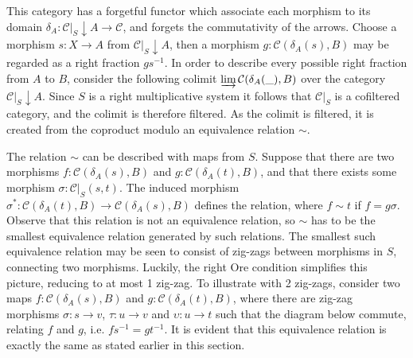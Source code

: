     This category has a forgetful functor which associate each morphism to its domain $\delta_{A} : \mathcal{C}|_{S}\downarrow A \rightarrow \mathcal{C}$, and forgets the commutativity of the arrows. Choose a morphism $s : X \rightarrow A$ from $\mathcal{C}|_{S}\downarrow A$, then a morphism $g:\mathcal{C}(\delta_{A}(s),B)$ may be regarded as a right fraction $gs^{-1}$. In order to describe every possible right fraction from $A$ to $B$, consider the following colimit $\varinjlim\mathcal{C}(\delta_{A}(\_),B)$ over the category $\mathcal{C}|_{S}\downarrow A$. Since $S$ is a right multiplicative system it follows that $\mathcal{C}|_{S}$ is a cofiltered category, and the colimit is therefore filtered. As the colimit is filtered, it is created from the coproduct modulo an equivalence relation $\sim$. 
    
    The relation $\sim$ can be described with maps from $S$. Suppose that there are two morphisms $f : \mathcal{C}(\delta_A(s),B)$ and $g : \mathcal{C}(\delta_A(t),B)$, and that there exists some morphism $\sigma : \mathcal{C}|_{S}(s,t)$. The induced morphism $\sigma^* : \mathcal{C}(\delta_A(t),B) \rightarrow \mathcal{C}(\delta_A(s),B)$ defines the relation, where $f \sim t$ if $f = g\sigma$. Observe that this relation is not an equivalence relation, so $\sim$ has to be the smallest equivalence relation generated by such relations. The smallest such equivalence relation may be seen to consist of zig-zags between morphisms in $S$, connecting two morphisms. Luckily, the right Ore condition simplifies this picture, reducing to at most 1 zig-zag. To illustrate with 2 zig-zags, consider two maps $f : \mathcal{C}(\delta_A(s),B)$ and $g : \mathcal{C}(\delta_A(t),B)$, where there are zig-zag morphisms $\sigma : s \rightarrow v$, $\tau : u \rightarrow v$ and $\upsilon : u \rightarrow t$ such that the diagram below commute, relating $f$ and $g$, i.e. $fs^{-1}=gt^{-1}$. It is evident that this equivalence relation is exactly the same as stated earlier in this section.

    \begin{center}
    \end{center}

